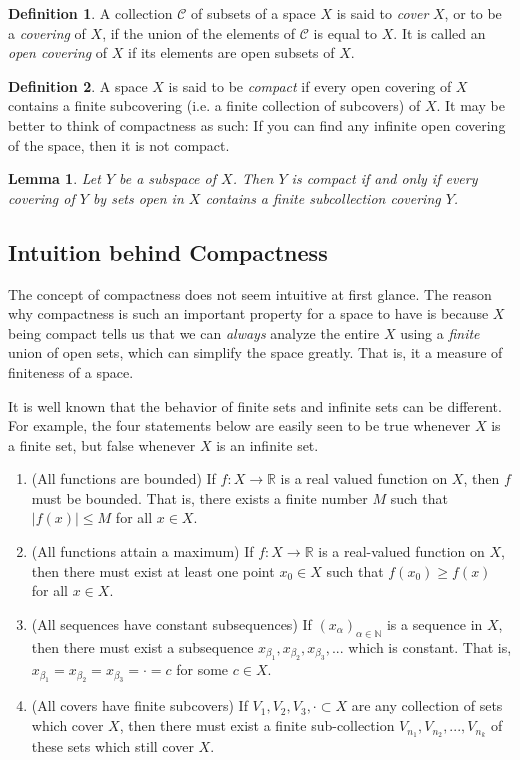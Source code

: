 \documentclass{article}
\newtheorem{lemma}[theorem]{Lemma}
\theoremstyle{remark}
\theoremstyle{definition}
\newtheorem{definition}{Definition}[section]
\begin{document}
\begin{definition}
A collection $\mathscr{C}$ of subsets of a space $X$ is said to \textit{cover} $X$, or to be a \textit{covering} of $X$, if the union of the elements of $\mathscr{C}$ is equal to $X$. It is called an \textit{open covering} of $X$ if its elements are open subsets of $X$. 
\end{definition}

\begin{definition}
A space $X$ is said to be \textit{compact} if every open covering of $X$ contains a finite subcovering (i.e. a finite collection of subcovers) of $X$. It may be better to think of compactness as such: If you can find any infinite open covering of the space, then it is not compact. 
\end{definition}

\begin{lemma}
Let $Y$ be a subspace of $X$. Then $Y$ is compact if and only if every covering of $Y$ by sets open in $X$ contains a finite subcollection covering $Y$. 
\end{lemma}

\subsection{Intuition behind Compactness}
The concept of compactness does not seem intuitive at first glance. The reason why compactness is such an important property for a space to have is because $X$ being compact tells us that we can \textit{always} analyze the entire $X$ using a \textit{finite} union of open sets, which can simplify the space greatly. That is, it a measure of finiteness of a space. 

It is well known that the behavior of finite sets and infinite sets can be different. For example, the four statements below are easily seen to be true whenever $X$ is a finite set, but false whenever $X$ is an infinite set. 
\begin{enumerate}
    \item (All functions are bounded) If $f: X \longrightarrow \mathbb{R}$ is a real valued function on $X$, then $f$ must be bounded. That is, there exists a finite number $M$ such that $|f(x)| \leq M$ for all $x \in X$. 
    \item (All functions attain a maximum) If $f: X \longrightarrow \mathbb{R}$ is a real-valued function on $X$, then there must exist at least one point $x_0 \in X$ such that $f(x_0) \geq f(x)$ for all $x \in X$. 
    \item (All sequences have constant subsequences) If $(x_\alpha)_{\alpha \in \mathbb{N}}$ is a sequence in $X$, then there must exist a subsequence $x_{\beta_1}, x_{\beta_2}, x_{\beta_3}, ...$ which is constant. That is, $x_{\beta_1} = x_{\beta_2} = x_{\beta_3} = \cdot = c$ for some $c \in X$. 
    \item (All covers have finite subcovers) If $V_1, V_2, V_3, \cdot \subset X$ are any collection of sets which cover $X$, then there must exist a finite sub-collection $V_{n_1}, V_{n_2}, ..., V_{n_k}$ of these sets which still cover $X$. 
\end{enumerate}
\end{document}

